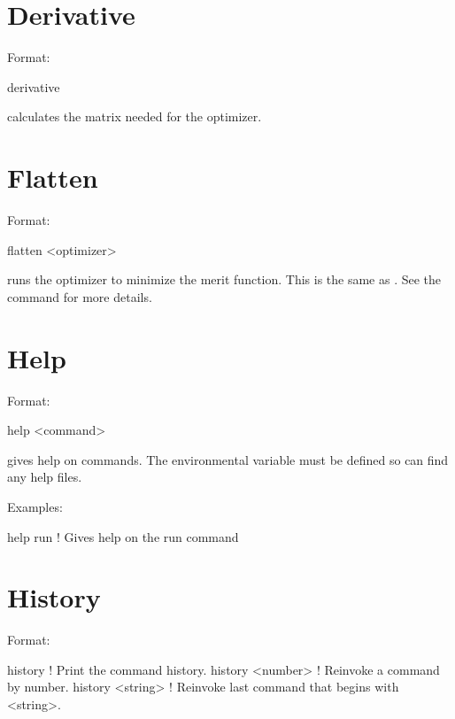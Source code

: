 \section{Derivative}
\label{s:deriv}

Format:
\begin{example}
  derivative
\end{example}

\vskip 0.2in
 calculates the  matrix needed for the  optimizer.

\section{Flatten}
\label{s:flatten}

Format:
\begin{example}
  flatten <optimizer>
\end{example}

\vskip 0.2in
 runs the optimizer to minimize the merit function. This is the 
same as . See the  command for more details.

\section{Help}
\label{s:help}

Format:
\begin{example}
  help <command>
\end{example}

\vskip 0.2in 
 gives help on \tao commands. The environmental
variable  must be defined so \tao can find any help files.

Examples:
\begin{example}
  help run   ! Gives help on the run command
\end{example}

\section{History}
\label{s:history}

Format:
\begin{example}
  history           ! Print the command history.
  history <number>  ! Reinvoke a command by number.
  history <string>  ! Reinvoke last command that begins with <string>.
\end{example}

